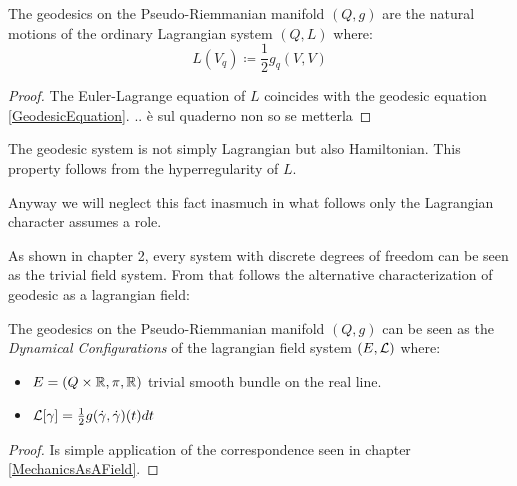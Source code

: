 \documentclass[Main]{subfiles}
\begin{document}

	\begin{theorem}
		The geodesics on the Pseudo-Riemmanian manifold $(Q,g)$ are the natural motions of the ordinary Lagrangian system $(Q, L)$ where:
		\begin{equation}
			L(V_q) \coloneqq \frac{1}{2} g_q(V,V)
		\end{equation}
	\end{theorem}	
	\begin{proof}
		 The Euler-Lagrange equation of $L$ coincides with the geodesic equation \ref{GeodesicEquation}.
		 \danger.. è sul quaderno non so se metterla
	\end{proof}

	\begin{observation}
		The geodesic system is not simply Lagrangian but also Hamiltonian.
		This property follows from the hyperregularity\cite{Abraham1978} of $L$.
		
		\begin{Warning}
		Anyway we will neglect this fact inasmuch in what follows only the Lagrangian character assumes a role.
		\end{Warning}
	\end{observation}


	As shown in chapter 2, every system with discrete degrees of freedom can be seen as the trivial field system.
	From that follows the alternative characterization of geodesic as a lagrangian field:
	\begin{corollary}
		The geodesics on the Pseudo-Riemmanian manifold $(Q,g)$ can be seen as the \emph{Dynamical Configurations} of the lagrangian field system $(E,\mathcal{L})$ where:
		\begin{itemize}
			\item $E=(Q\times\mathbb{R}, \pi, \mathbb{R})$ trivial smooth bundle on the real line.
			\item $\mathcal{L}[\gamma] = \frac{1}{2} g(\dot{\gamma},\dot{\gamma})(t) dt$
		\end{itemize}
	\end{corollary}
	\begin{proof}
		Is simple application of the correspondence seen in chapter \ref{MechanicsAsAField}.
	\end{proof}
	
\end{document}
